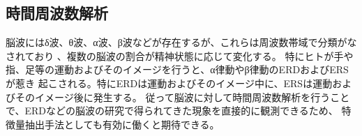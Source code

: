 \subsection{時間周波数解析}
脳波にはδ波、θ波、α波、β波などが存在するが、これらは周波数帯域で分類がなされており
、複数の脳波の割合が精神状態に応じて変化する。
特にヒトが手や指、足等の運動およびそのイメージを行うと、α律動やβ律動のERDおよびERSが惹き
起こされる\cite{ERDとERS}。特にERDは運動およびそのイメージ中に、ERSは運動およびそのイメージ後に発生する。
従って脳波に対して時間周波数解析を行うことで、ERDなどの脳波の研究で得られてきた現象を直接的に観測できるため、
特徴量抽出手法としても有効に働くと期待できる。





